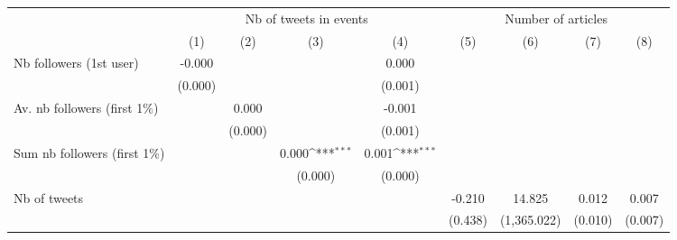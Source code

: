 {
\def\sym#1{\ifmmode^{#1}\else\(^{#1}\)\fi}
\begin{tabular}{l*{8}{c}}
\hline\hline
                    &\multicolumn{4}{c}{Nb of tweets in events}                                             &\multicolumn{4}{c}{Number of articles}                                                 \\\cmidrule(lr){2-5}\cmidrule(lr){6-9}
                    &\multicolumn{1}{c}{(1)}         &\multicolumn{1}{c}{(2)}         &\multicolumn{1}{c}{(3)}         &\multicolumn{1}{c}{(4)}         &\multicolumn{1}{c}{(5)}         &\multicolumn{1}{c}{(6)}         &\multicolumn{1}{c}{(7)}         &\multicolumn{1}{c}{(8)}         \\
\hline
Nb followers (1st user)&      -0.000         &                     &                     &       0.000         &                     &                     &                     &                     \\
                    &     (0.000)         &                     &                     &     (0.001)         &                     &                     &                     &                     \\
Av. nb followers (first 1$\%$)&                     &       0.000         &                     &      -0.001         &                     &                     &                     &                     \\
                    &                     &     (0.000)         &                     &     (0.001)         &                     &                     &                     &                     \\
Sum nb followers (first 1$\%$)&                     &                     &       0.000\sym{***}&       0.001\sym{***}&                     &                     &                     &                     \\
                    &                     &                     &     (0.000)         &     (0.000)         &                     &                     &                     &                     \\
Nb of tweets        &                     &                     &                     &                     &      -0.210         &      14.825         &       0.012         &       0.007         \\
                    &                     &                     &                     &                     &     (0.438)         & (1,365.022)         &     (0.010)         &     (0.007)         \\

\end{tabular}}
